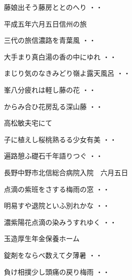 \begin{shiika}藤娘出そう藤房ととのへり
\hfill{・・}\end{shiika}
\vspace{0.4cm}
平成五年六月五日信州の旅
\begin{shiika}三代の旅信濃路を青葉風
\hfill{・・}\end{shiika}
\begin{shiika}大手まり真白湯の香の中にゆれ
\hfill{・・}\end{shiika}
\begin{shiika}まじり気のなきみどり嶺よ露天風呂
\hfill{・・}\end{shiika}
\begin{shiika}峯八分疲れは軽し藤の花
\hfill{・・}\end{shiika}
\begin{shiika}からみ合ひ花房乱る深山藤
\hfill{・・}\end{shiika}
\vspace{0.4cm}
高松敏夫宅にて
\begin{shiika}子に植えし桜桃熟るる少女有美
\hfill{・・}\end{shiika}
\begin{shiika}遍路憩ふ礎石千年語りつぐ
\hfill{・・}\end{shiika}
\vspace{0.4cm}
長野中野市北信総合病院入院　六月五日
\begin{shiika}点滴の紫班をさする梅雨の窓
\hfill{・・}\end{shiika}
\begin{shiika}明易すや退院といふ別れかな
\hfill{・・}\end{shiika}
\begin{shiika}濃紫陽花点滴の染みうすれゆく
\hfill{・・}\end{shiika}
\vspace{0.4cm}
玉造厚生年金保養ホーム
\begin{shiika}錠剤をならべ数えて夕薄暑
\hfill{・・}\end{shiika}
\begin{shiika}負け相撲少し頭痛の戻り梅雨
\hfill{・・}\end{shiika}
